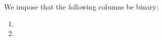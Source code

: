 We impose that the following columns be binary:
\begin{multicols}{2}
	\begin{enumerate}
		\item \dataSizeTotal{}
		\item \logLogsData{}
	\end{enumerate}
\end{multicols}
